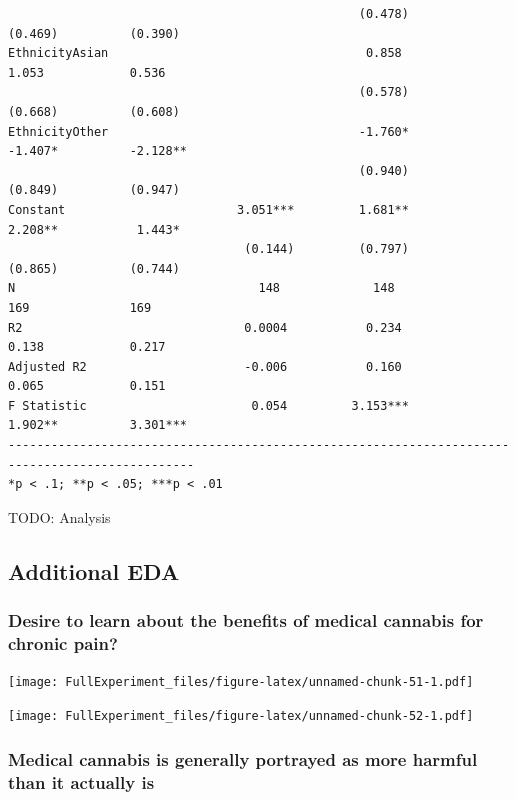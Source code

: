 \documentclass[
]{article}
\begin{document}
\begin{verbatim}
                                                 (0.478)          (0.469)          (0.390)      
EthnicityAsian                                    0.858            1.053            0.536       
                                                 (0.578)          (0.668)          (0.608)      
EthnicityOther                                   -1.760*          -1.407*          -2.128**     
                                                 (0.940)          (0.849)          (0.947)      
Constant                        3.051***         1.681**          2.208**           1.443*      
                                 (0.144)         (0.797)          (0.865)          (0.744)      
N                                  148             148              169              169        
R2                               0.0004           0.234            0.138            0.217       
Adjusted R2                      -0.006           0.160            0.065            0.151       
F Statistic                       0.054         3.153***          1.902**          3.301***     
------------------------------------------------------------------------------------------------
*p < .1; **p < .05; ***p < .01                                                                  
\end{verbatim}

TODO: Analysis

\hypertarget{additional-eda}{%
\subsection{Additional EDA}\label{additional-eda}}

\hypertarget{desire-to-learn-about-the-benefits-of-medical-cannabis-for-chronic-pain}{%
\subsubsection{Desire to learn about the benefits of medical cannabis
for chronic
pain?}\label{desire-to-learn-about-the-benefits-of-medical-cannabis-for-chronic-pain}}

\texttt{[image: FullExperiment\_files/figure-latex/unnamed-chunk-51-1.pdf]}

\texttt{[image: FullExperiment\_files/figure-latex/unnamed-chunk-52-1.pdf]}

\hypertarget{medical-cannabis-is-generally-portrayed-as-more-harmful-than-it-actually-is}{%
\subsubsection{Medical cannabis is generally portrayed as more harmful
than it actually
is}\label{medical-cannabis-is-generally-portrayed-as-more-harmful-than-it-actually-is}}
\end{document}

